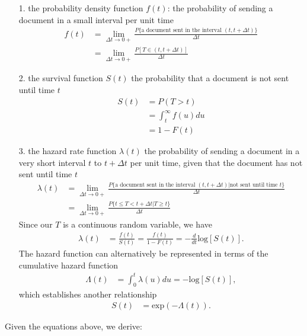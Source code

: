 \documentclass[a4paper]{article}
\begin{document}
\begin{itemize}
	\item [1. ] the probability density function $f(t)$: \newline the probability of sending a document in a small interval per unit time
	\begin{align*}
	f(t) &= \lim\limits_{\Delta t \rightarrow 0+} \frac{P\{\mbox{a document sent in the interval } (t, t+ \Delta t)\}}{\Delta t} \\&
	= \lim\limits_{\Delta t \rightarrow 0+} \frac{P[T \in (t, t+ \Delta t)]}{\Delta t}
	\end{align*}
	\item [2. ] the survival function $S(t)$\newline
	the probability that a document is not sent until time $t$
	\begin{align*}
	S(t) &= P(T>t) \\& = \int_{t}^{\infty} f(u)du \\& = 1-F(t)
	\end{align*}
	\item [3. ] the hazard rate function $\lambda(t)$ \newline
	the probability of sending a document in a very short interval $t$ to  $t+ \Delta t$  per unit time, given that the document has not sent until time $t$ 
		\begin{align*}
		\lambda(t) &= \lim\limits_{\Delta t \rightarrow 0+} \frac{P\{\mbox{a document sent in the interval } (t, t+ \Delta t)|\mbox{not sent until time $t$}\}}{\Delta t} \\&
		= \lim\limits_{\Delta t \rightarrow 0+} \frac{P\{t \leq T < t+ \Delta t|T\geq t\}}{\Delta t}
		\end{align*}
		Since our $T$ is a continuous random variable, we have
				\begin{align*}
				\lambda(t) &=\frac{f(t)}{S(t)} = \frac{f(t)}{1-F(t)} = -\frac{d}{dt} \mbox{log}[S(t)].
				\end{align*}
		The hazard function can alternatively be represented in terms of the cumulative hazard function
			\begin{align*}
			\Lambda(t) &=  \int_{0}^{t} \lambda(u)du = -\mbox{log}[S(t)],
			\end{align*}
			which establishes another relationship
				\begin{align*}
				S(t) &=  \mbox{exp}(-\Lambda(t)).
				\end{align*}
\end{itemize}
Given the equations above, we derive:
\end{document}
